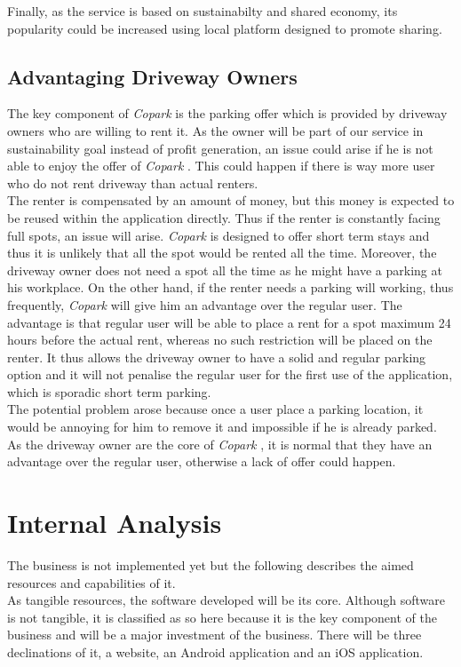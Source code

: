 \documentclass[12pt,a4paper,oneside]{book}
\newcommand{\bp}{\textit{Copark }}
\begin{document}
Finally, as the service is based on sustainabilty and shared economy, its popularity could be increased using local platform designed to promote sharing.

\subsection{Advantaging Driveway Owners}
\label{advdo}
The key component of \bp is the parking offer which is provided by driveway owners who are willing to rent it. As the owner will be part of our service in sustainability goal instead of profit generation, an issue could arise if he is not able to enjoy the offer of \bp. This could happen if there is way more user who do not rent driveway than actual renters.\\

The renter is compensated by an amount of money, but this money is expected to be reused within the application directly. Thus if the renter is constantly facing full spots, an issue will arise. \bp is designed to offer short term stays and thus it is unlikely that all the spot would be rented all the time. Moreover, the driveway owner does not need a spot all the time as he might have a parking at his workplace. On the other hand, if the renter needs a parking will working, thus frequently, \bp will give him an advantage over the regular user. The advantage is that regular user will be able to place a rent for a spot maximum 24 hours before the actual rent, whereas no such restriction will be placed on the renter. It thus allows the driveway owner to have a solid and regular parking option and it will not penalise the regular user for the first use of the application, which is sporadic short term parking.\\

The potential problem arose because once a user place a parking location, it would be annoying for him to remove it and impossible if he is already parked. As the driveway owner are the core of \bp, it is normal that they have an advantage over the regular user, otherwise a lack of offer could happen.

\section{Internal Analysis}
The business is not implemented yet but the following describes the aimed resources and capabilities of it.\\

As tangible resources, the software developed will be its core. Although software is not tangible, it is classified as so here because it is the key component of the business and will be a major investment of the business. There will be three declinations of it, a website, an Android application and an iOS application.\\
\end{document}
